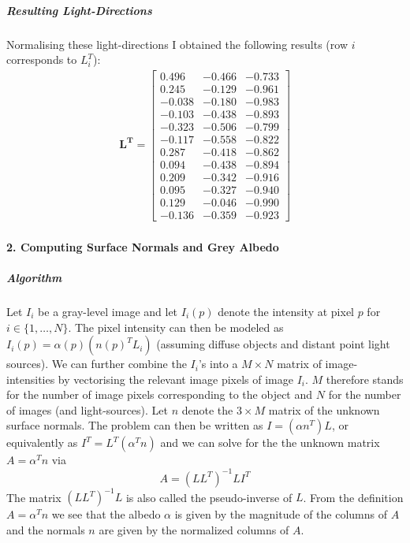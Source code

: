 \documentclass{paper}
\begin{document}
\subparagraph{Resulting Light-Directions} 
Normalising these light-directions I obtained the following results
(row $i$ corresponds to $L_i^T$):
\begin{align}
\mathbf{L^T}= \left[ \begin{array}{ccc}
0.496 & -0.466 & -0.733\\
0.245 & -0.129 & -0.961 \\
-0.038 & -0.180 & -0.983 \\
-0.103 & -0.438 & -0.893 \\
-0.323 & -0.506 & -0.799 \\
-0.117 & -0.558 & -0.822 \\
0.287 & -0.418 & -0.862 \\
0.094 & -0.438 & -0.894 \\
0.209 & -0.342 & -0.916 \\
0.095 & -0.327 & -0.940 \\
0.129 & -0.046 & -0.990 \\
-0.136 & -0.359 & -0.923 
\end{array} \right] \nonumber
\end{align}


\paragraph{2. Computing Surface Normals and Grey Albedo}
\subparagraph{Algorithm} 
Let $I_i$ be a gray-level image and let $I_i(p)$ denote the intensity at
pixel $p$ for $i\in{\{1,\hdots,N\}}$. The pixel intensity can then be
modeled as $I_i(p)=\alpha(p)(n(p)^TL_i)$ (assuming diffuse objects and
distant point light sources). We can further combine the $I_i$'s into
a $M\times N$ matrix of image-intensities by vectorising the relevant
image pixels of image $I_i$. $M$ therefore stands for the number of
image pixels corresponding to the object and $N$ for the number of
images (and light-sources). Let $n$ denote the $3 \times M$ matrix of
the unknown surface normals.
The problem can then be written as $I=(\alpha n^T)L$, or
equivalently as $I^T=L^T(\alpha^T n)$ and we can
solve for the the unknown matrix $A=\alpha^T n$ via 
\begin{equation} 
A=(LL^T)^{-1}LI^T
\end{equation}
The matrix $(LL^T)^{-1}L$ is also called the pseudo-inverse of
$L$. From the definition $A=\alpha^T n$ we see that the albedo
$\alpha$ is given by the magnitude of the columns of $A$ and the
normals $n$ are given by the normalized columns of $A$. 
\end{document}
